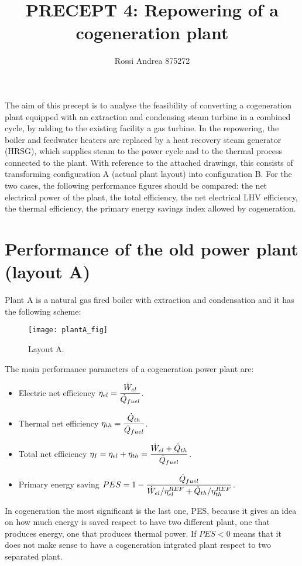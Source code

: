 \documentclass[a4paper,12pt]{article}
\title{\textbf{PRECEPT 4}: Repowering of a cogeneration plant}
\author{Rossi Andrea 875272}
\date{}
\begin{document}
\maketitle

The aim of this precept is to analyse the feasibility of converting a cogeneration plant equipped with an extraction and condensing steam turbine in a combined cycle, by adding to the existing facility a gas turbine. In the repowering, the boiler and feedwater heaters are replaced by a heat recovery steam generator (HRSG), which supplies steam to the power cycle and to the thermal process connected to the plant. With reference to the attached drawings, this consists of transforming configuration A (actual plant layout) into configuration B. For the two cases, the following performance figures should be compared: the net electrical power of the plant, the total efficiency, the net electrical LHV efficiency, the thermal efficiency, the primary energy savings index allowed by cogeneration. 

\section{Performance of the old power plant (layout A) }
Plant A is a natural gas fired boiler with extraction and condensation and it has the following scheme:

\begin{figure}[h]
  \caption{Layout A.}
  \centering
    \texttt{[image: plantA\_fig]}
\end{figure}

The main performance parameters of a cogeneration power plant are:
\begin{itemize}
\item Electric net efficiency $\displaystyle \eta_{el} = \frac{\dot{W}_{el}}{\dot{Q}_{fuel}}$.
\item Thermal net efficiency $\displaystyle \eta_{th} = \frac{\dot{Q}_{th}}{\dot{Q}_{fuel}}$.
\item Total net efficiency $\displaystyle \eta_{I} = \eta_{el} + \eta_{th} = \frac{\dot{W}_{el}+\dot{Q}_{th}}{\dot{Q}_{fuel}}$.
\item Primary energy saving $\displaystyle PES = 1-\frac{\dot{Q}_{fuel}}{\dot{W}_{el}/\eta^{REF}_{el}  +  \dot{Q}_{th}/\eta^{REF}_{th}}$.
\end{itemize}
In cogeneration the most significant is the last one, PES, because it gives an idea on how much energy is saved respect to have two different plant, one that produces energy, one that produces thermal power. If $PES<0$ means that it does not make sense to have a cogeneration intgrated plant respect to two separated plant.
\end{document}
